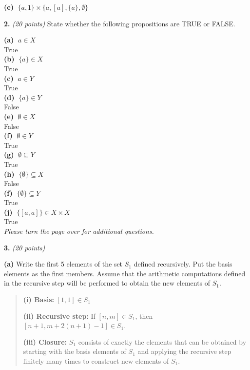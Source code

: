 \documentclass[12pt]{article}
\begin{document}
  {\bf (e) } $\; \{a,1\} \times \{ a, [a], \{a\}, \emptyset \} $ 

\vspace{0.1in}

{\bf 2.} {\em (20 points)} State whether the following propositions are
TRUE or FALSE.


  {\bf (a) } $\; a \in X$\\
True\\
  {\bf (b) } $\; \{a\} \in X$\\
True\\
  {\bf (c) } $\; a \in Y$\\
True\\
  {\bf (d) } $\; \{a\} \in Y$\\
False\\
  {\bf (e) } $\; \emptyset \in X$\\
False\\
  {\bf (f) } $\; \emptyset \in Y$\\
True\\
  {\bf (g) } $\; \emptyset \subseteq Y$\\
True\\
  {\bf (h) } $\; \{ \emptyset \} \subseteq X$\\
False\\
  {\bf (f) } $\; \{ \emptyset \} \subseteq Y$\\
True\\
  {\bf (j) } $\; \{[a,a]\} \in X \times X$ \\
True\\

\hfill {\em Please turn the page over for additional questions. }
\newpage

{\bf 3.} {\em (20 points)} 

{\bf (a) }
Write the first 5 elements of the set $S_1$ defined recursively.
Put the basis elements as the first members.
Assume that the arithmetic computations defined in the recursive step 
will be performed to obtain the new elements of $S_1$.

\begin{quote}
{\bf (i) Basis:} $[1,1] \in S_1$

{\bf (ii) Recursive step:} If $[n,m] \in S_1$, then
$[n+1, m+ 2(n+1)- 1 ] \in S_1$.

{\bf (iii) Closure:} $S_1$ consists of exactly the elements that can be
obtained by starting with the basis elements of $S_1$ and applying the
recursive step finitely many times to construct new elements of $S_1$.
\end{quote}
\end{document}
